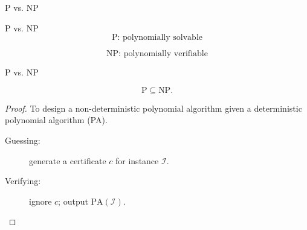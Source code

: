 \begin{frame}{P vs. NP}
  \begin{block}{P vs. NP}
    \[
      \text{P: polynomially solvable}
    \]

    \[
      \text{NP: polynomially verifiable}
    \]
  \end{block}

\end{frame}
\begin{frame}{P vs. NP}
  \begin{theorem}{}
    \[
      \text{P} \subseteq \text{NP}.
    \]
  \end{theorem}

  \begin{proof}
    To design a non-deterministic polynomial algorithm given a deterministic polynomial algorithm (PA).
    \begin{description}
      \item[Guessing:] generate a certificate $c$ for instance $\mathcal{I}$.
      \item[Verifying:] ignore $c$; output $\text{PA}(\mathcal{I})$.
    \end{description}
  \end{proof}
\end{frame}
